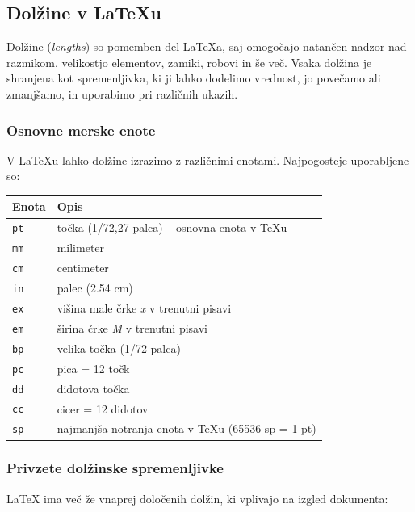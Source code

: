 \subsection{Dolžine v LaTeXu}

Dolžine (\textit{lengths}) so pomemben del LaTeXa, saj omogočajo natančen nadzor nad razmikom, velikostjo elementov, zamiki, robovi in še več.
Vsaka dolžina je shranjena kot spremenljivka, ki ji lahko dodelimo vrednost, jo povečamo ali zmanjšamo, in uporabimo pri različnih ukazih.

\subsubsection{Osnovne merske enote}

V LaTeXu lahko dolžine izrazimo z različnimi enotami. Najpogosteje uporabljene so:

\bigskip\noindent
\begin{tabular}{p{}p{}}
\toprule
Enota & Opis \\
\hline
\texttt{pt} & točka (1/72,27 palca) -- osnovna enota v TeXu \\
\texttt{mm} & milimeter \\
\texttt{cm} & centimeter \\
\texttt{in} & palec (2.54 cm) \\
\texttt{ex} & višina male črke \textit{x} v trenutni pisavi \\
\texttt{em} & širina črke \textit{M} v trenutni pisavi \\
\texttt{bp} & velika točka (1/72 palca) \\
\texttt{pc} & pica = 12 točk \\
\texttt{dd} & didotova točka \\
\texttt{cc} & cicer = 12 didotov \\
\texttt{sp} & najmanjša notranja enota v TeXu (65536 sp = 1 pt) \\
\bottomrule
\end{tabular}

\bigskip\subsubsection{Privzete dolžinske spremenljivke}

LaTeX ima več že vnaprej določenih dolžin, ki vplivajo na izgled dokumenta:

